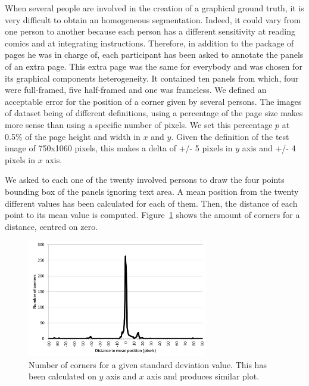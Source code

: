 When several people are involved in the creation of a graphical ground truth, it is very difficult to obtain an homogeneous segmentation.
Indeed, it could vary from one person to another because each person has a different sensitivity at reading comics and at integrating instructions.
Therefore, in addition to the package of pages he was in charge of, each participant has been asked to annotate the panels of an extra page. 
This extra page was the same for everybody and was chosen for its graphical components heterogeneity. 
It contained ten panels from which, four were full-framed, five half-framed and one was frameless.
We defined an acceptable error for the position of a corner given by several persons.
The images of dataset being of different definitions, using a percentage of the page size makes more sense than using a specific number of pixels.
We set this percentage $p$ at 0.5\% of the page height and width in $x$ and $y$. 
Given the definition of the test image of 750x1060 pixels, this makes a delta of +/- 5 pixels in $y$ axis and +/- 4 pixels in $x$ axis. 

We asked to each one of the twenty involved persons to draw the four points bounding box of the panels ignoring text area.
A mean position from the twenty different values has been calculated for each of them.
Then, the distance of each point to its mean value is computed. 
Figure~\ref{fig:gt:graphiqueStdVT} shows the amount of corners for a distance, centred on zero.


\begin{figure}[h!]
\begin{center}
\includegraphics[width=0.7\textwidth]{stdVT.png}
\caption[Distance to the mean position]{Number of corners for a given standard deviation value. This has been calculated on $y$ axis and $x$ axis and produces similar plot.}
\label{fig:gt:graphiqueStdVT}
\end{center}
\end{figure}

